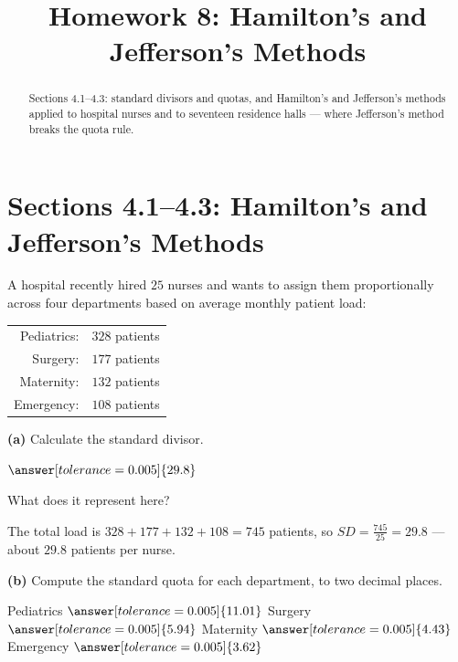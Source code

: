 \documentclass[12pt]{ximera}
\title{Homework 8: Hamilton's and Jefferson's Methods}
\begin{document}
\begin{abstract}
Sections 4.1--4.3: standard divisors and quotas, and Hamilton's and Jefferson's methods
applied to hospital nurses and to seventeen residence halls --- where Jefferson's method
breaks the quota rule.
\end{abstract}
\maketitle

\section*{Sections 4.1--4.3: Hamilton's and Jefferson's Methods}

\begin{problem}
A hospital recently hired $25$ nurses and wants to assign them proportionally across
four departments based on average monthly patient load:
\begin{center}
\begin{tabular}{rl}
Pediatrics: & $328$ patients\\
Surgery: & $177$ patients\\
Maternity: & $132$ patients\\
Emergency: & $108$ patients
\end{tabular}
\end{center}

\begin{prompt}
\textbf{(a)} Calculate the standard divisor.

$\answer[tolerance=0.005]{29.8}$

What does it represent here?
\begin{multipleChoice}
\end{multipleChoice}

\begin{feedback}
The total load is $328+177+132+108=745$ patients, so
$SD=\frac{745}{25}=29.8$ --- about $29.8$ patients per nurse.
\end{feedback}
\end{prompt}

\begin{prompt}
\textbf{(b)} Compute the standard quota for each department, to two decimal places.

Pediatrics $\answer[tolerance=0.005]{11.01}$ \quad Surgery $\answer[tolerance=0.005]{5.94}$
\quad Maternity $\answer[tolerance=0.005]{4.43}$ \quad Emergency $\answer[tolerance=0.005]{3.62}$


\end{prompt}
\end{problem}
\end{document}
